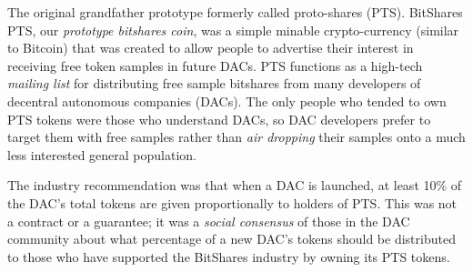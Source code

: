 The original grandfather prototype formerly called proto-shares (PTS).
BitShares PTS, our \emph{prototype bitshares coin}, was a simple minable
crypto-currency (similar to Bitcoin) that was created to allow people to
advertise their interest in receiving free token samples in future DACs. PTS
functions as a high-tech \emph{mailing list} for distributing free sample
bitshares from many developers of decentral autonomous companies (DACs). The
only people who tended to own PTS tokens were those who understand DACs, so DAC
developers prefer to target them with free samples rather than \emph{air
dropping} their samples onto a much less interested general population.

The industry recommendation was that when a DAC is launched, at least 10\% of
the DAC's total tokens are given proportionally to holders of PTS. This was not
a contract or a guarantee; it was a \emph{social consensus} of those in the DAC
community about what percentage of a new DAC's tokens should be distributed to
those who have supported the BitShares industry by owning its PTS tokens.
